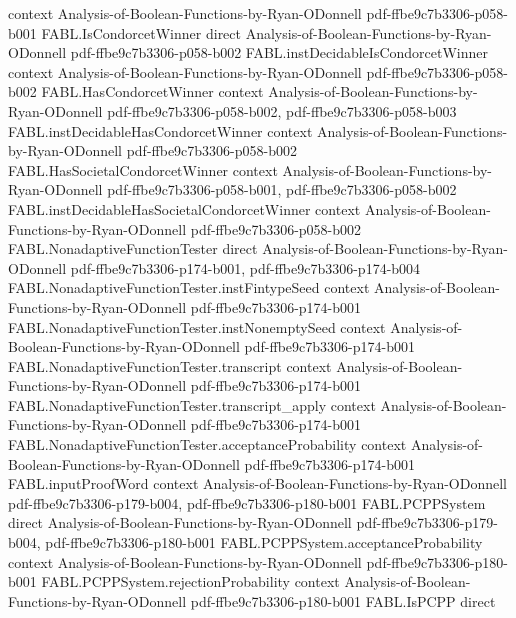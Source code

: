\begin{theorem}
  {context}
  {Analysis-of-Boolean-Functions-by-Ryan-ODonnell}
  {pdf-ffbe9c7b3306-p058-b001}
\proofstep
  {FABL.IsCondorcetWinner}
  {direct}
  {Analysis-of-Boolean-Functions-by-Ryan-ODonnell}
  {pdf-ffbe9c7b3306-p058-b002}
\proofstep
  {FABL.instDecidableIsCondorcetWinner}
  {context}
  {Analysis-of-Boolean-Functions-by-Ryan-ODonnell}
  {pdf-ffbe9c7b3306-p058-b002}
\proofstep
  {FABL.HasCondorcetWinner}
  {context}
  {Analysis-of-Boolean-Functions-by-Ryan-ODonnell}
  {pdf-ffbe9c7b3306-p058-b002,
    pdf-ffbe9c7b3306-p058-b003}
\proofstep
  {FABL.instDecidableHasCondorcetWinner}
  {context}
  {Analysis-of-Boolean-Functions-by-Ryan-ODonnell}
  {pdf-ffbe9c7b3306-p058-b002}
\proofstep
  {FABL.HasSocietalCondorcetWinner}
  {context}
  {Analysis-of-Boolean-Functions-by-Ryan-ODonnell}
  {pdf-ffbe9c7b3306-p058-b001,
    pdf-ffbe9c7b3306-p058-b002}
\proofstep
  {FABL.instDecidableHasSocietalCondorcetWinner}
  {context}
  {Analysis-of-Boolean-Functions-by-Ryan-ODonnell}
  {pdf-ffbe9c7b3306-p058-b002}
\proofstep
  {FABL.NonadaptiveFunctionTester}
  {direct}
  {Analysis-of-Boolean-Functions-by-Ryan-ODonnell}
  {pdf-ffbe9c7b3306-p174-b001,
    pdf-ffbe9c7b3306-p174-b004}
\proofstep
  {FABL.NonadaptiveFunctionTester.instFintypeSeed}
  {context}
  {Analysis-of-Boolean-Functions-by-Ryan-ODonnell}
  {pdf-ffbe9c7b3306-p174-b001}
\proofstep
  {FABL.NonadaptiveFunctionTester.instNonemptySeed}
  {context}
  {Analysis-of-Boolean-Functions-by-Ryan-ODonnell}
  {pdf-ffbe9c7b3306-p174-b001}
\proofstep
  {FABL.NonadaptiveFunctionTester.transcript}
  {context}
  {Analysis-of-Boolean-Functions-by-Ryan-ODonnell}
  {pdf-ffbe9c7b3306-p174-b001}
\proofstep
  {FABL.NonadaptiveFunctionTester.transcript_apply}
  {context}
  {Analysis-of-Boolean-Functions-by-Ryan-ODonnell}
  {pdf-ffbe9c7b3306-p174-b001}
\proofstep
  {FABL.NonadaptiveFunctionTester.acceptanceProbability}
  {context}
  {Analysis-of-Boolean-Functions-by-Ryan-ODonnell}
  {pdf-ffbe9c7b3306-p174-b001}
\proofstep
  {FABL.inputProofWord}
  {context}
  {Analysis-of-Boolean-Functions-by-Ryan-ODonnell}
  {pdf-ffbe9c7b3306-p179-b004,
    pdf-ffbe9c7b3306-p180-b001}
\proofstep
  {FABL.PCPPSystem}
  {direct}
  {Analysis-of-Boolean-Functions-by-Ryan-ODonnell}
  {pdf-ffbe9c7b3306-p179-b004,
    pdf-ffbe9c7b3306-p180-b001}
\proofstep
  {FABL.PCPPSystem.acceptanceProbability}
  {context}
  {Analysis-of-Boolean-Functions-by-Ryan-ODonnell}
  {pdf-ffbe9c7b3306-p180-b001}
\proofstep
  {FABL.PCPPSystem.rejectionProbability}
  {context}
  {Analysis-of-Boolean-Functions-by-Ryan-ODonnell}
  {pdf-ffbe9c7b3306-p180-b001}
\proofstep
  {FABL.IsPCPP}
  {direct}

\end{theorem}
